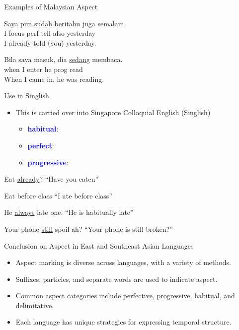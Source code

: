\documentclass{beamer}
\newcommand{\txx}[1]{\textcolor{blue}{\textbf{#1}}}
\newcommand{\ul}[1]{\uline{#1}}
\begin{document}
\begin{frame}{Examples of Malaysian Aspect}
\begin{exe}
\ex
\gll Saya pun \ul{sudah} beritahu juga semalam. \\
    I focus perf tell also yesterday \\
\trans I already told (you) yesterday. \\
\end{exe}
\begin{exe}
\ex
\gll Bila saya masuk, dia \ul{sedang} membaca. \\
    when I enter he prog read \\
\trans When I came in, he was reading. \\
\end{exe}
\end{frame}

\begin{frame}{Use in Singlish}
  \begin{itemize}
  \item This is carried over into Singapore Colloquial English (Singlish)
    \begin{itemize}
    \item \txx{habitual}: 
    \item \txx{perfect}: 
    \item \txx{progressive}: 
    \end{itemize}
  \end{itemize}
  \begin{exe}
  \ex   Eat \ul{already}?  ``Have you eaten''

  \ex  Eat before class ``I ate before class''

  \ex  He \ul{always} late one. ``He is habitually late''

   \ex  Your phone \ul{still} spoil ah? ``Your phone is still broken?'' 
   \end{exe}
\end{frame}


\begin{frame}{Conclusion on Aspect in East and Southeast Asian Languages}
\begin{itemize}
    \item Aspect marking is diverse across languages, with a variety of methods.
    \item Suffixes, particles, and separate words are used to indicate aspect.
    \item Common aspect categories include perfective, progressive, habitual, and delimitative.
    \item Each language has unique strategies for expressing temporal structure.
\end{itemize}
\end{frame}
\end{document}
